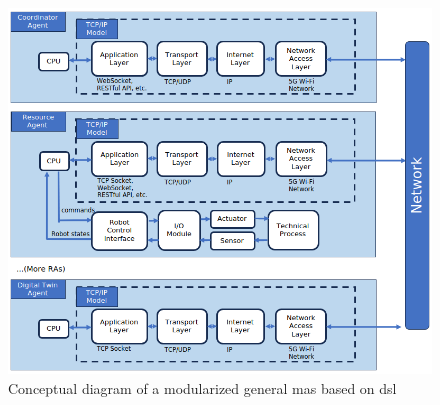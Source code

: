 \begin{figure}[htb]
    \includegraphics[width=\textwidth]{figures/DSLConceptual.png}
    
    \centering
    \caption{Conceptual diagram of a modularized general \gls{mas} based on \gls{dsl} \label{fig: DSLConceptual}}
\end{figure}
